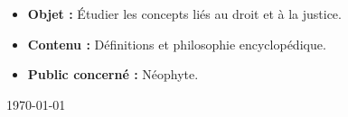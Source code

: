 \begin{titlepage}
\vfill
{\sf \footnotesize
\begin{itemize}[leftmargin=1cm, label=, itemsep=1pt]
\item {\bf Objet : } Étudier les concepts liés au droit et à la justice.
\item {\bf Contenu : } Définitions et philosophie encyclopédique.
\item {\bf Public concerné : } Néophyte.
\end{itemize}
}

\vfill

{\large \today}

\end{titlepage}
